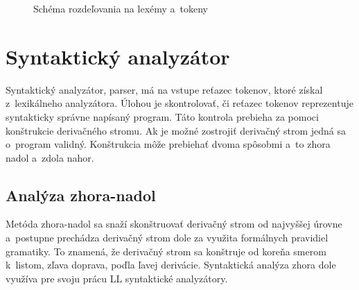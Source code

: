 \begin{center}
\begin{figure}
\caption{Schéma rozdeľovania na lexémy a~tokeny}
\label{fig:lex}

\end{figure}
\end{center}


\section{Syntaktický analyzátor}
Syntaktický analyzátor, parser, má na vstupe reťazec tokenov, ktoré získal
z~lexikálneho analyzátora. Úlohou je skontrolovať, či
reťazec tokenov reprezentuje syntakticky správne napísaný program. Táto kontrola
prebieha za pomoci konštrukcie derivačného stromu. Ak je možné zostrojiť derivačný strom
jedná sa o~program validný. Konštrukcia môže prebiehať dvoma spôsobmi a~to zhora
nadol a~zdola nahor. \cite{meduna} 

\subsection{Analýza zhora-nadol}
Metóda zhora-nadol sa snaží skonštruovať derivačný strom od najvyššej úrovne a~postupne prechádza derivačný strom dole za využita formálnych pravidiel gramatiky. To znamená, že derivačný strom sa konštruje od koreňa smerom k~listom, zľava doprava, poďla ľavej derivácie. Syntaktická analýza zhora dole využíva pre svoju prácu LL syntaktické analyzátory. \cite{aho}


